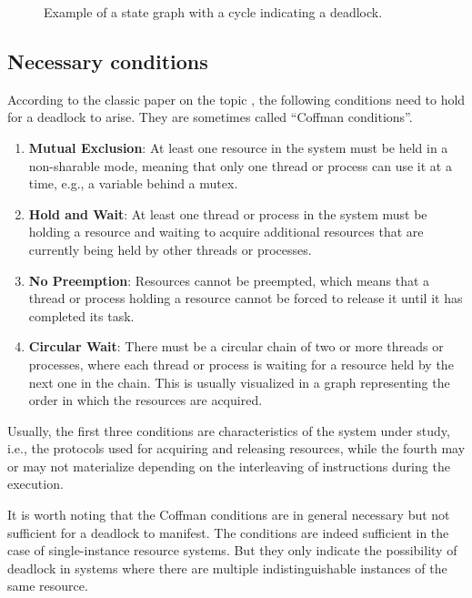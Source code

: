 \begin{figure}[!htb]
      \centering
      
      \caption{Example of a state graph with a cycle indicating a deadlock.}
      \label{fig:state-graph-example}
\end{figure}
\subsection{Necessary conditions}
\label{sec:coffman-conditions}

According to the classic paper on the topic \cite{coffman1971deadlocks},
the following conditions need to hold for a deadlock to arise.
They are sometimes called ``Coffman conditions''.

\begin{enumerate}
      \item \textbf{Mutual Exclusion}: At least one resource in the system must
            be held in a non-sharable mode, meaning that only one thread or process can use it at a time,
            e.g., a variable behind a mutex.
      \item \textbf{Hold and Wait}: At least one thread or process in the system must
            be holding a resource and waiting to acquire additional resources
            that are currently being held by other threads or processes.
      \item \textbf{No Preemption}: Resources cannot be preempted, which means that a thread or process
            holding a resource cannot be forced to release it until it has completed its task.
      \item \textbf{Circular Wait}: There must be a circular chain of two or more threads or processes,
            where each thread or process is waiting for a resource held by the next one in the chain.
            This is usually visualized in a graph representing the order in which the resources are acquired.
\end{enumerate}

Usually, the first three conditions are characteristics of the system under study, i.e.,
the protocols used for acquiring and releasing resources,
while the fourth may or may not materialize depending
on the interleaving of instructions during the execution.

It is worth noting that the Coffman conditions are in general necessary
but not sufficient for a deadlock to manifest.
The conditions are indeed sufficient in the case of single-instance resource systems.
But they only indicate the possibility of deadlock in systems
where there are multiple indistinguishable instances of the same resource.

